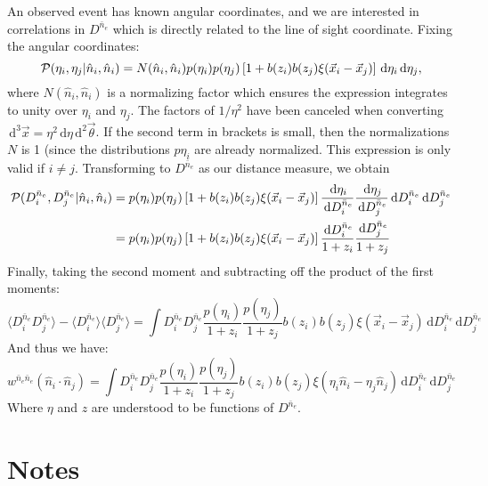 \documentclass[onecolumn,prd,noshowpacs,nofootinbib,amsmath,amssymb]{revtex4}
\newcommand{\ud}{\,\mathrm{d}}
\newcommand{\Dne}{D^{\bar{n}_e}}
\newcommand{\calP}{{\cal P}}
\begin{document}
An observed event has known angular coordinates, and we are interested in
correlations in $\Dne$ which is directly related to the line of sight
coordinate.  Fixing the angular coordinates:
\begin{equation}
    \calP(\eta_i, \eta_j | \hat{n}_i, \hat{n}_i) = N(\hat{n}_i, \hat{n}_i)
    p(\eta_i)p(\eta_j) \left[ 1 + b(z_i)
    b(z_j) \xi(\vec x_i - \vec x_j) \right] \ud \eta_i \ud \eta_j,
\end{equation}
where $N(\hat{n}_i, \hat{n}_i)$ is a normalizing factor which ensures the
expression integrates to unity over $\eta_i$ and $\eta_j$. The factors of
$1/\eta^2$ have been canceled when converting $\ud^3 \vec x = \eta^2 \ud \eta \ud^2
\vec \theta$. If the second term in brackets is small, then the normalizations
$N$ is 1 (since the distributions $p{\eta_i}$ are already normalized. 
This expression is
only valid if $i \ne j$.
Transforming to $\Dne$ as our distance measure, we obtain
\begin{align}
\calP(\Dne_i, \Dne_j | \hat{n}_i, \hat{n}_i)
    &= p(\eta_i)p(\eta_j) \left[ 1 + b(z_i)
        b(z_j) \xi(\vec x_i - \vec x_j) \right]
        \frac{\ud \eta_i}{\ud \Dne_i} \frac{\ud \eta_j}{\ud \Dne_j}
        \ud \Dne_i\ud \Dne_j
        \\
    &= p(\eta_i)p(\eta_j) \left[ 1 + b(z_i)
        b(z_j) \xi(\vec x_i - \vec x_j) \right]
        \frac{\ud \Dne_i}{1 + z_i}\frac{\ud \Dne_j}{1 + z_j}
\end{align}
Finally, taking the second moment and subtracting off the product of the first
moments:
\begin{equation}
\langle \Dne_i \Dne_j \rangle
    - \langle \Dne_i \rangle \langle \Dne_j \rangle =
    \int \Dne_i \Dne_j
    \frac{p(\eta_i)}{1 + z_i}\frac{p(\eta_j)}{1 + z_j}
    b(z_i) b(z_j) \xi(\vec x_i - \vec x_j)
        \ud \Dne_i\ud \Dne_j
\end{equation}
And thus we have:
\begin{equation}
    w^{\bar{n}_e \bar{n}_e}(\hat{n}_i\cdot\hat{n}_j)
        =\int \Dne_i \Dne_j
    \frac{p(\eta_i)}{1 + z_i}\frac{p(\eta_j)}{1 + z_j}
    b(z_i) b(z_j) \xi(\eta_i \hat{n}_i - \eta_j \hat{n}_j)
        \ud \Dne_i\ud \Dne_j
\end{equation}
Where $\eta$ and $z$ are understood to be functions of $\Dne$.






\section{Notes}\label{sec:notes}
\end{document}
